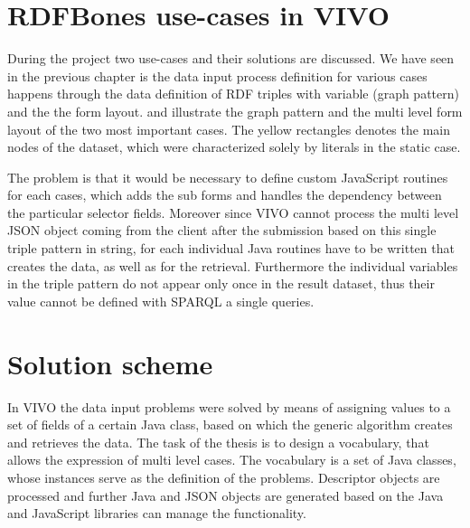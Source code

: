 \section{RDFBones use-cases in VIVO}

During the project two use-cases and their solutions are discussed. We have seen in the previous chapter is the data input process definition for various cases happens through the data definition of RDF triples with variable (graph pattern) and the the form layout.  and  illustrate the graph pattern and the multi level form layout of the two most important cases. The yellow rectangles denotes the main nodes of the dataset, which were characterized solely by literals in the static case.



The problem is that it would be necessary to define custom JavaScript routines for each cases, which adds the sub forms and handles the dependency between the particular selector fields. Moreover since VIVO cannot process the multi level JSON object coming from the client after the submission based on this single triple pattern in string, for each individual Java routines have to be written that creates the data, as well as for the retrieval. Furthermore the individual variables in the triple pattern do not appear only once in the result dataset, thus their value cannot be defined with SPARQL a single queries.

\section{Solution scheme}

In VIVO the data input problems were solved by means of assigning values to a set of fields of a certain Java class, based on which the generic algorithm creates and retrieves the data. The task of the thesis is to design a vocabulary, that allows the expression of multi level cases. The vocabulary is a set of Java classes, whose instances serve as the definition of the problems. Descriptor objects are processed and further Java and JSON objects are generated based on the Java and JavaScript libraries can manage the functionality.


